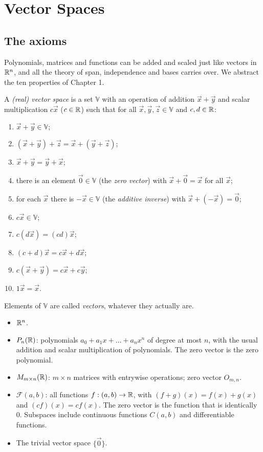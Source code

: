 \chapter{Vector Spaces}

\section{The axioms}

Polynomials, matrices and functions can be added and scaled just like vectors in $\mathbb{R}^n$, and all the
theory of span, independence and bases carries over. We abstract the ten properties of Chapter 1.

\begin{definition}
A \emph{(real) vector space} is a set $\mathbb{V}$ with an operation of addition $\vec x+\vec y$ and scalar
multiplication $c\vec x$ ($c\in\mathbb{R}$) such that for all $\vec x,\vec y,\vec z\in\mathbb{V}$ and $c,d\in\mathbb{R}$:
\begin{enumerate}[label=V\arabic*.]
  \item $\vec x+\vec y\in\mathbb{V}$;
  \item $(\vec x+\vec y)+\vec z=\vec x+(\vec y+\vec z)$;
  \item $\vec x+\vec y=\vec y+\vec x$;
  \item there is an element $\vec 0\in\mathbb{V}$ (the \emph{zero vector}) with $\vec x+\vec 0=\vec x$ for all $\vec x$;
  \item for each $\vec x$ there is $-\vec x\in\mathbb{V}$ (the \emph{additive inverse}) with $\vec x+(-\vec x)=\vec 0$;
  \item $c\vec x\in\mathbb{V}$;
  \item $c(d\vec x)=(cd)\vec x$;
  \item $(c+d)\vec x=c\vec x+d\vec x$;
  \item $c(\vec x+\vec y)=c\vec x+c\vec y$;
  \item $1\vec x=\vec x$.
\end{enumerate}
Elements of $\mathbb{V}$ are called \emph{vectors}, whatever they actually are.
\end{definition}

\begin{example}
\begin{itemize}
  \item $\mathbb{R}^n$.
  \item $P_{n}(\mathbb{R})$: polynomials $a_0+a_1x+\dots+a_nx^n$ of degree at most $n$, with the usual addition and scalar
        multiplication of polynomials. The zero vector is the zero polynomial.
  \item $M_{m\times n}(\mathbb{R})$: $m\times n$ matrices with entrywise operations; zero vector $O_{m,n}$.
  \item $\mathcal{F}(a,b)$: all functions $f:(a,b)\to\mathbb{R}$, with $(f+g)(x)=f(x)+g(x)$ and $(cf)(x)=cf(x)$. The
        zero vector is the function that is identically $0$. Subspaces include continuous functions
        $C(a,b)$ and differentiable functions.
  \item The trivial vector space $\{\vec 0\}$.
\end{itemize}
\end{example}

